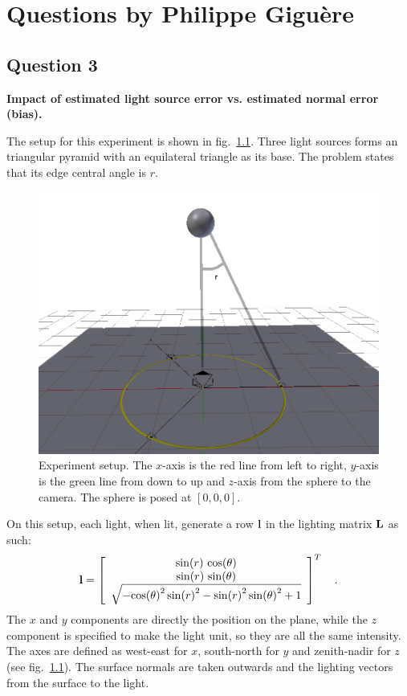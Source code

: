 \documentclass{report}
\begin{document}
\chapter{Questions by Philippe Giguère}

\section{Question 3}

\textbf{Impact of estimated light source error vs. estimated normal error (bias).}

The setup for this experiment is shown in fig.~\ref{q3:setup}. Three light sources forms an triangular pyramid with an equilateral triangle as its base. The problem states that its edge central angle is $r$.

\begin{figure}
  \centering
  \includegraphics[width=0.9\linewidth]{q3_setup.png}
  \caption[Experiment setup]
   {Experiment setup. The $x$-axis is the red line from left to right, $y$-axis is the green line from down to up and $z$-axis from the sphere to the camera. The sphere is posed at $\left[0, 0, 0\right]$.}
  \label{q3:setup}
\end{figure}

On this setup, each light, when lit, generate a row $\mathbf{l}$ in the lighting matrix $\mathbf{L}$ as such:
\begin{equation}
\B{l} =
\left[\begin{array}{c} \sin\!\left(r\right)\, \cos\!\left(\theta\right) \\ \sin\!\left(r\right)\, \sin\!\left(\theta\right) \\ \sqrt{ - {\cos\!\left(\theta\right)}^2\, {\sin\!\left(r\right)}^2 - {\sin\!\left(r\right)}^2\, {\sin\!\left(\theta\right)}^2 + 1} \end{array}\right]^T
\quad .
\end{equation}
The $x$ and $y$ components are directly the position on the plane, while the $z$ component is specified to make the light unit, so they are all the same intensity. The axes are defined as west-east for $x$, south-north for $y$ and zenith-nadir for $z$ (see fig.~\ref{q3:setup}). The surface normals are taken outwards and the lighting vectors from the surface to the light.
\end{document}
